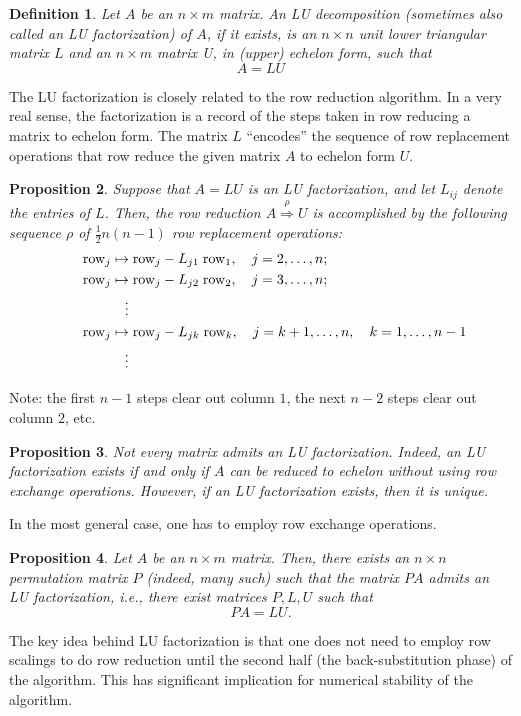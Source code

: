 \documentclass[12pt]{article}
\newtheorem{proposition}{Proposition}
\newtheorem{definition}[proposition]{Definition}
\newcommand{\row}{\mathrm{row}}
\begin{document}
\begin{definition}
  Let $A$ be an $n\times m$ matrix.  An LU decomposition (sometimes also called an LU factorization) of $A$, if it
  exists, is an $n\times n$ unit lower triangular matrix $L$ and an
  $n\times m$ matrix U, in (upper) echelon form, such that
  \[ A = LU \]
\end{definition}
The LU factorization is closely related to the row reduction
algorithm.  In a very real sense, the factorization is a record of the
steps taken in row reducing a matrix to echelon form.  The  matrix
$L$ ``encodes'' the sequence of row replacement operations that row
reduce the given matrix $A$ to echelon form $U$.
\begin{proposition}
  Suppose that $A=LU$ is an LU factorization, and let $L_{ij}$ denote
  the entries of $L$.  Then, the row reduction
  $A\stackrel{\rho}{\Longrightarrow} U$ is accomplished by the
  following sequence $\rho$ of $\tfrac{1}{2}n(n-1)$ row replacement
  operations:
  \begin{align*}
    \hskip 2em & \row_j \mapsto  \row_j-L_{j1}\; \row_1,\quad
    j=2,\ldots, n;\\ 
     & \row_j \mapsto  \row_j-L_{j2}\; \row_2,\quad j=3,\ldots, n;\\
    & \hskip  3em \vdots \\
    & \row_j \mapsto  \row_j-L_{jk}\; \row_k,\quad j=k+1,\ldots,
    n,\quad k=1,\ldots,n-1 \\  
    & \hskip 3em \vdots 
  \end{align*}
\end{proposition}
Note: the first $n-1$ steps clear out column $1$, the next $n-2$ steps
clear out column $2$, etc.
\begin{proposition}
  Not every matrix admits an LU factorization.  Indeed, an LU
  factorization exists if and only if $A$ can be reduced to echelon
  without using row exchange operations.  However, if an LU
  factorization exists, then it is unique.
\end{proposition}


In the most general case, one has to employ row exchange operations.
\begin{proposition}
  Let $A$ be an $n\times m$ matrix.  Then, there exists an $n\times n$
  permutation matrix $P$ (indeed, many such) such that the matrix $PA$
  admits an LU factorization, i.e., there exist matrices $P, L, U$
  such that
  \[ PA=LU. \]
\end{proposition}
The key idea behind LU factorization is that one does not need to
employ row scalings to do row reduction until the second half (the
back-substitution phase) of the algorithm.  This has significant
implication for numerical stability of the algorithm.
\end{document}
